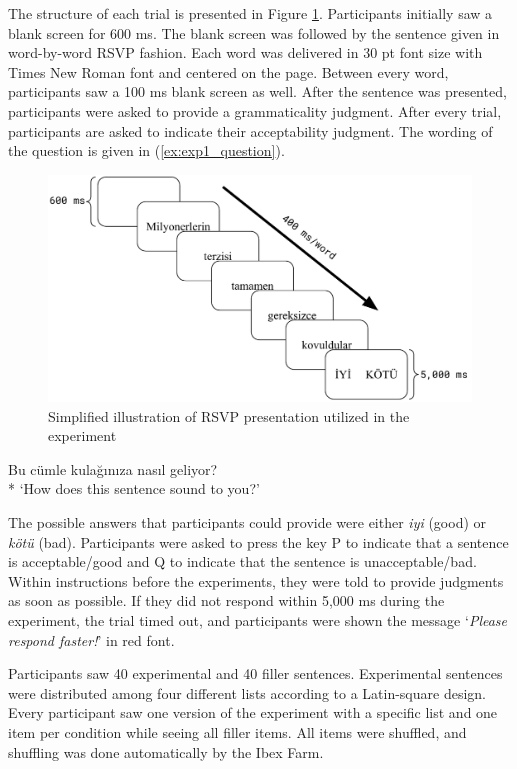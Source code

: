 The structure of each trial is presented in Figure \ref{fig:trial_infographic}. Participants initially saw a blank screen for 600 ms. The blank screen was followed by the sentence given in word-by-word RSVP fashion. Each word was delivered in 30 pt font size with Times New Roman font and centered on the page. Between every word, participants saw a 100 ms blank screen as well. After the sentence was presented, participants were asked to provide a grammaticality judgment. After every trial, participants are asked to indicate their acceptability judgment. The wording of the question is given in (\ref{ex:exp1_question}). 

\begin{figure}[hbt!]
    \centering
    \includegraphics[width=\textwidth]{figure/trial_infographic.pdf}
    \caption{Simplified illustration of RSVP presentation utilized in the experiment}
    \label{fig:trial_infographic}
\end{figure}

\ea \label{ex:exp1_question}
Bu c\"umle kula\u{g}{\i}n{\i}za nas{\i}l geliyor? \\*
`How does this sentence sound to you?'
\z

The possible answers that participants could provide were either \emph{iyi} (good) or \emph{k\"ot\"u} (bad). Participants were asked to press the key P to indicate that a sentence is acceptable/good and Q to indicate that the sentence is unacceptable/bad. Within instructions before the experiments, they were told to provide judgments as soon as possible. If they did not respond within 5,000 ms during the experiment, the trial timed out, and participants were shown the message `\emph{Please respond faster!}' in red font.

Participants saw 40 experimental and 40 filler sentences. Experimental sentences were distributed among four different lists according to a Latin-square design. Every participant saw one version of the experiment with a specific list and one item per condition while seeing all filler items. All items were shuffled, and shuffling was done automatically by the Ibex Farm.

